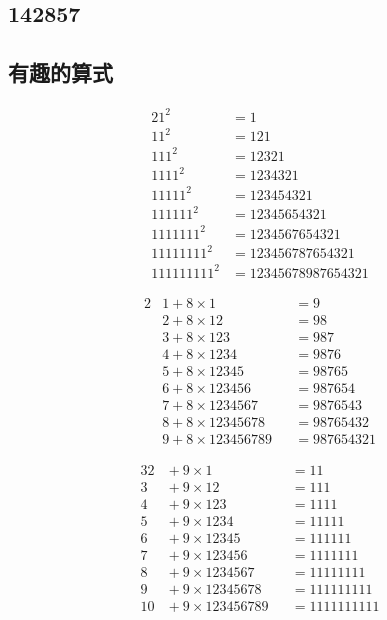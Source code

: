 \subsection{142857}
\label{sec:number-142857}



\subsection{有趣的算式}
\label{sec:interesting-equations}

\begin{example}
  \begin{alignat*}{2}
    1^2 &{}= 1\\
    11^2 &{}= 121\\
    111^2 &{}= 12321\\
    1111^2 &{}= 1234321\\
    11111^2 &{}= 123454321\\
    111111^2 &{}= 12345654321\\
    1111111^2 &{}= 1234567654321\\
    11111111^2 &{}= 123456787654321\\
    111111111^2 &{}= 12345678987654321
  \end{alignat*}
\end{example}

\begin{example}
  \begin{alignat*}{2}
    &1 + 8\times 1 &{}&{}= 9\\
    &2 + 8\times 12 &{}&{}= 98\\
    &3 + 8\times 123 &{}&{}= 987\\
    &4 + 8\times 1234 &{}&{}= 9876\\
    &5 + 8\times 12345 &{}&{}= 98765\\
    &6 + 8\times 123456 &{}&{}= 987654\\
    &7 + 8\times 1234567 &{}&{}= 9876543\\
    &8 + 8\times 12345678 &{}&{}= 98765432\\
    &9 + 8\times 123456789 &{}&{}= 987654321
  \end{alignat*}
\end{example}

\begin{example}
  \begin{alignat*}{3}
    2 &{}+ 9 \times 1 &&{}= 11\\
    3 &{}+ 9 \times 12 &&{}= 111\\
    4 &{}+ 9 \times 123 &&{}= 1111\\
    5 &{}+ 9 \times 1234 &&{}= 11111\\
    6 &{}+ 9 \times 12345 &&{}= 111111\\
    7 &{}+ 9 \times 123456 &&{}= 1111111\\
    8 &{}+ 9 \times 1234567 &&{}= 11111111\\
    9 &{}+ 9 \times 12345678 &&{}= 111111111\\
    10&{}+ 9 \times 123456789 &&{}= 1111111111
  \end{alignat*}
\end{example}

